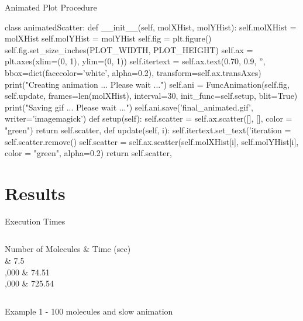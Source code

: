 \documentclass{if-beamer}
\begin{document}
\begin{frame}[fragile]{Animated Plot Procedure}
	\begin{python}
class animatedScatter:
    def __init__(self, molXHist, molYHist):
    self.molXHist = molXHist
        self.molYHist = molYHist
        self.fig = plt.figure()
        self.fig.set_size_inches(PLOT_WIDTH, PLOT_HEIGHT)
        self.ax = plt.axes(xlim=(0, 1), ylim=(0, 1))
        self.itertext = self.ax.text(0.70, 0.9,  '', bbox=dict(facecolor='white', alpha=0.2), transform=self.ax.transAxes)
        print("Creating animation ... Please wait ...")
        self.ani = FuncAnimation(self.fig, self.update, frames=len(molXHist), interval=30, 
                init_func=self.setup, blit=True)
        print("Saving gif ... Please wait ...")
        self.ani.save('final_animated.gif', writer='imagemagick')
    def setup(self):
        self.scatter = self.ax.scatter([], [], color = "green")
        return self.scatter,
    def update(self, i):
        self.itertext.set_text('iteration = %
        self.scatter.remove()
        self.scatter = self.ax.scatter(self.molXHist[i], self.molYHist[i], color = "green", alpha=0.2)
        return self.scatter,
	\end{python}
\end{frame}

\section{Results}

\begin{frame}{Execution Times}
	\begin{columns}
		\begin{column}{0.8\textwidth}
			\begin{tcolorbox}[tableblue,tabularx={X||Y}, boxrule=0.5pt, title=Execution Times]
				Number of Molecules & Time (sec) \\\hline{}    & 7.5    \\,000  & 74.51  \\,000 & 725.54 \\
			\end{tcolorbox}
		\end{column}
	\end{columns}
\end{frame}

\begin{frame}{Example 1 - 100 molecules and slow animation}
	\begin{center}
	\end{center}
\end{frame}
\end{document}
